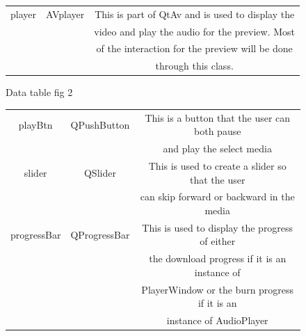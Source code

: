 \documentclass{article}
\begin{document}
\begin{figure}[H]
\begin{center}
\begin{tabular} { | c | c | c |}
            player            &  AVplayer    &This is part of QtAv and is used to display the \\
                                             &&video and play the audio for the preview. Most \\
                                             &&of the interaction for the preview will be done\\
                                             &&through this class.                            \\ \hline
        \end{tabular}
    \end{center}
    \caption{Data table fig 2} \label{fig:dataTable2}
\end{figure}


\begin{figure}[H]
    \begin{center}
        \begin{tabular} { | c | c | c |}
            \hline
            playBtn           & QPushButton  &This is a button that the user can both pause   \\
                                             &&and play the select media                      \\ \hline
            slider            & QSlider      &This is used to create a slider so that the user\\
                                             &&can skip forward or backward in the media      \\ \hline
            progressBar       & QProgressBar &This is used to display the progress of either  \\
                                             &&the download progress if it is an instance of  \\
                                             &&PlayerWindow or the burn progress if it is an  \\
                                             &&instance of AudioPlayer                        \\ \hline



\end{tabular}
\end{center}
\end{figure}
\end{document}
